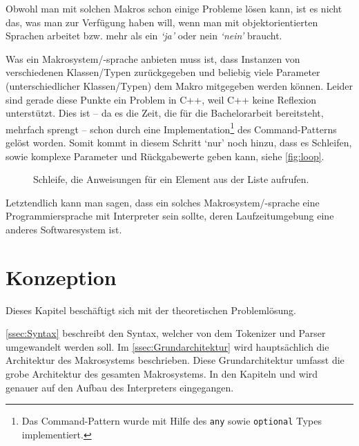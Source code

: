     Obwohl man mit solchen Makros schon einige Probleme lösen kann, ist es nicht das, was man zur Verfügung haben will, wenn man mit objektorientierten Sprachen arbeitet bzw. mehr als ein \textit{`ja'} oder nein \textit{`nein'} braucht.

    Was ein Makrosystem/-sprache anbieten muss ist, dass Instanzen von verschiedenen Klassen/Typen zurückgegeben und beliebig viele Parameter (unterschiedlicher Klassen/Typen) dem Makro mitgegeben werden können. Leider sind gerade diese Punkte ein Problem in C++, weil C++ keine Reflexion\autocites{vinoski2005time}{ferber1989computational} unterstützt. Dies ist -- da es die Zeit, die für die Bachelorarbeit bereitsteht, mehrfach sprengt -- schon durch eine Implementation\footnote{%
      Das Command-Pattern wurde mit Hilfe des \texttt{any}
      sowie \texttt{optional}
      Types implementiert.
    }\spewnotes{}
    des Command-Patterns gelöst worden. Somit kommt in diesem Schritt `nur' noch hinzu, dass es Schleifen, sowie komplexe Parameter und Rückgabewerte geben kann, siehe \autoref{fig:loop}.

    \begin{figure}[H]
      \centering
      \caption{Schleife, die Anweisungen für ein Element aus der Liste aufrufen.}
      \label{fig:loop}
    \end{figure}

    Letztendlich kann man sagen, dass ein solches Makrosystem/-sprache eine Programmiersprache mit Interpreter sein sollte, deren Laufzeitumgebung eine anderes Softwaresystem ist.

\section{Konzeption}
\label{sec:Konzeption}
  Dieses Kapitel beschäftigt sich mit der theoretischen Problemlösung.

  \autoref{ssec:Syntax} beschreibt den Syntax, welcher von dem Tokenizer und Parser umgewandelt werden soll. Im \autoref{ssec:Grundarchitektur} wird hauptsächlich die Architektur des Makrosystems beschrieben. Diese Grundarchitektur umfasst die grobe Architektur des gesamten Makrosystems. In den Kapiteln  und
   wird genauer auf den Aufbau des Interpreters eingegangen.

